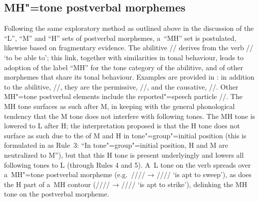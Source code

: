 \subsection[MH tone]{MH"=tone postverbal morphemes}
\label{sec:mhtonesuffixes}

Following the same exploratory method as outlined above in the discussion of the “L”, “M” and “H” sets of postverbal morphemes, a~“MH” set is postulated, likewise based on fragmentary evidence. The {abilitive} // derives from the verb // ‘to be able to'; this link, together with similarities in tonal behaviour, leads to adoption of the label “MH” for the tone category of the {abilitive}, and of other morphemes that share its tonal behaviour. Examples are provided in : in addition to the {abilitive}, //, they are the {permissive}, //, and the {causative}, //. Other MH"=tone postverbal elements include the reported"=speech particle //. The MH tone surfaces as such after M, in keeping with the general phonological tendency that the M tone does not interfere with
following tones. The MH tone is lowered to L after H; the interpretation proposed is that the H tone does not surface as such due to the
 of M and H in tone"=group"=initial position (this is formulated in  as Rule~3: “In tone"=group"=initial position, H and M are neutralized to M''), but that this H tone is present underlyingly and lowers
all following tones to L (through Rules 4 and 5). A~L tone on the verb spreads over a~MH"=tone postverbal morpheme (e.g.\ //// → //// ‘is apt to sweep'), as does
the H part of a~MH contour (//// → //// ‘is apt to strike'), delinking the MH tone on the postverbal morpheme.

